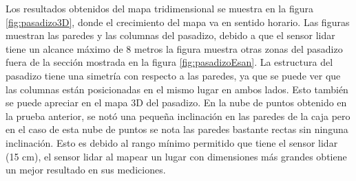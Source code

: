 Los resultados obtenidos del mapa tridimensional se muestra en la figura \ref{fig:pasadizo3D}, 
donde el crecimiento del mapa va en sentido horario. Las figuras muestran las paredes y las 
columnas del pasadizo, debido a que el sensor lidar tiene un alcance máximo de 8 metros la 
figura muestra otras zonas del pasadizo fuera de la sección mostrada en la figura 
\ref{fig:pasadizoEsan}. La estructura del pasadizo tiene una simetría con respecto a las 
paredes, ya que se puede ver que las columnas están posicionadas en el mismo lugar en 
ambos lados. Esto también se puede apreciar en el mapa 3D del pasadizo. En la nube de puntos 
obtenido en la prueba anterior, se notó una pequeña inclinación en las paredes de la caja 
pero en el caso de esta nube de puntos se nota las paredes bastante rectas sin ninguna 
inclinación. Esto es debido al rango mínimo permitido que tiene el sensor lidar (15 cm), 
el sensor lidar al mapear un lugar con dimensiones más grandes obtiene un mejor resultado en 
sus mediciones.
